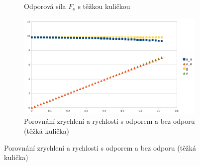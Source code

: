 \documentclass{fkssolpub}
\begin{document}
\begin{figure}[h!]
\begin{subfigure}[b]{0.5\textwidth}
		\caption{Odporová síla $F_o$ s těžkou kuličkou}
		\label{fig:c}
	\end{subfigure}
	\begin{subfigure}[b]{0.5\textwidth}
		\centering
		\includegraphics[width=\textwidth]{6-fig4.png}
		\caption{Porovnání zrychlení a rychlosti s odporem a bez odporu (těžká kulička)}
		\label{fig:d}
	\end{subfigure}
\end{figure}
\end{document}
